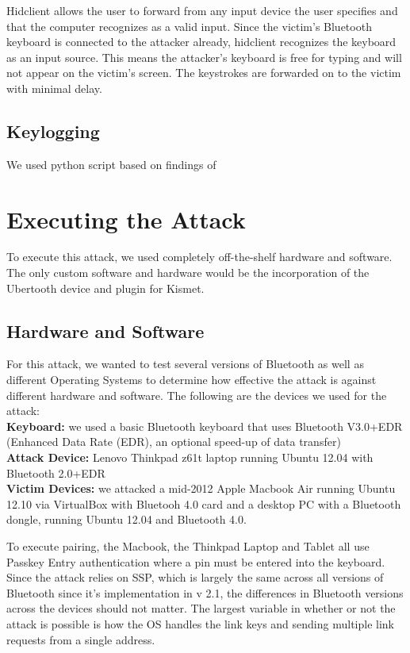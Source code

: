 \documentclass{acm_proc_article-sp}
\begin{document}
Hidclient allows the user to forward from any input device the user specifies and that the computer recognizes as a valid input. Since the victim's Bluetooth keyboard is connected to the attacker already, hidclient recognizes the keyboard as an input source. This means the attacker's keyboard is free for typing and will not appear on the victim's screen. The keystrokes are forwarded on to the victim with minimal delay. 

\subsection{Keylogging}
We used python script based on findings of \cite{chopper}


\section{Executing the Attack}
To execute this attack, we used completely off-the-shelf hardware and software. The only custom software and hardware would be the incorporation of the Ubertooth device and plugin for Kismet. 


\subsection{Hardware and Software}
For this attack, we wanted to test several versions of Bluetooth as well as different Operating Systems to determine how effective the attack is against different hardware and software. The following are the devices we used for the attack:\\
\textbf{Keyboard:} we used a basic Bluetooth keyboard that uses Bluetooth V3.0+EDR (Enhanced Data Rate (EDR), an optional speed-up of data transfer)\\
\textbf{Attack Device:} Lenovo Thinkpad z61t laptop running Ubuntu 12.04 with Bluetooth 2.0+EDR\\
\textbf{Victim Devices:} we attacked a mid-2012 Apple Macbook Air running Ubuntu 12.10 via VirtualBox with
Bluetooh 4.0 card and a desktop PC with a Bluetooth dongle, running Ubuntu 12.04 and Bluetooth 4.0.

To execute pairing, the Macbook, the Thinkpad Laptop and Tablet all use Passkey Entry authentication where a pin must be entered into the keyboard. Since the attack relies on SSP, which is largely the same across all versions of Bluetooth since it's implementation in v 2.1, the differences in Bluetooth versions across the devices should not matter. The largest variable in whether or not the attack is possible is how the OS handles the link keys and sending multiple link requests from a single address. 
\end{document}
